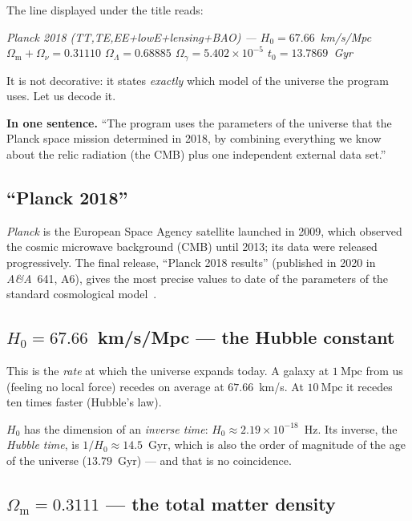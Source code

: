 \documentclass[11pt,a4paper,openany]{report}
\newcommand{\Mpc}{\text{Mpc}}
\newcommand{\Hzero}{H_{0}}
\newcommand{\Om}{\Omega_{\mathrm{m}}}
\newcommand{\OL}{\Omega_{\Lambda}}
\begin{document}
The line displayed under the title reads:

\begin{center}\itshape
Planck 2018 (TT,TE,EE+lowE+lensing+BAO) --- $\Hzero=67.66$~km/s/Mpc \quad
$\Om+\Omega_{\nu} = 0.31110$ \quad $\OL = 0.68885$ \quad
$\Omega_{\gamma} = 5.402\times10^{-5}$ \quad $t_{0} = 13.7869$~Gyr
\end{center}

\noindent It is not decorative: it states \emph{exactly} which model of the
universe the program uses. Let us decode it.

\begin{tcolorbox}[plain]
\textbf{In one sentence.} “The program uses the parameters of the universe
that the Planck space mission determined in 2018, by combining everything we
know about the relic radiation (the CMB) plus one independent external data
set.”
\end{tcolorbox}

\subsection{“Planck 2018”}

\emph{Planck} is the European Space Agency satellite launched in 2009, which
observed the cosmic microwave background (CMB) until 2013; its data were
released progressively. The final release, “Planck 2018 results” (published
in 2020 in \emph{A\&A}~641, A6), gives the most precise values to date of the
parameters of the standard cosmological model~\cite{Planck2018}.

\subsection{$\Hzero=67.66$~km/s/Mpc --- the Hubble constant}

This is the \emph{rate} at which the universe expands today. A galaxy at
$1~\Mpc$ from us (feeling no local force) recedes on average at
$67.66$~km/s. At $10~\Mpc$ it recedes ten times faster (Hubble's law).

\begin{tcolorbox}[warning]
$\Hzero$ has the dimension of an \emph{inverse time}: $\Hzero \approx
2.19\times 10^{-18}$~Hz. Its inverse, the \emph{Hubble time}, is
$1/\Hzero \approx 14.5$~Gyr, which is also the order of magnitude of the age of
the universe ($13.79$~Gyr) --- and that is no coincidence.
\end{tcolorbox}

\subsection{$\Om = 0.3111$ --- the total matter density}
\end{document}

